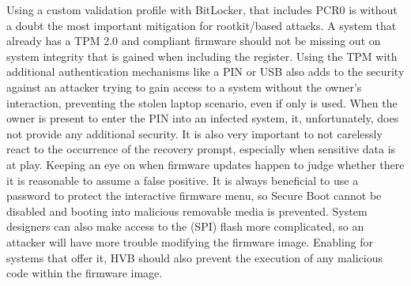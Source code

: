 Using a custom validation profile with BitLocker, that includes \ac{PCR}0 is without a doubt the most important mitigation for rootkit\-/based attacks.
A system that already has a \ac{TPM} 2.0 and compliant firmware should not be missing out on system integrity that is gained when including the register.
Using the \ac{TPM} with additional authentication mechanisms like a \ac{PIN} or \ac{USB} also adds to the security against an attacker trying to gain access to a system without the owner's interaction, preventing the stolen laptop scenario, even if only \hyperref[tab:pcr-usage]{} is used.
When the owner is present to enter the \ac{PIN} into an infected system, it, unfortunately, does not provide any additional security.
It is also very important to not carelessly react to the occurrence of the recovery prompt, especially when sensitive data is at play.
Keeping an eye on when firmware updates happen to judge whether there it is reasonable to assume a false positive.
It is always beneficial to use a password to protect the interactive firmware menu, so Secure Boot cannot be disabled and booting into malicious removable media is prevented.
System designers can also make access to the (\ac{SPI}) flash more complicated, so an attacker will have more trouble modifying the firmware image.
Enabling for systems that offer it, \ac{HVB} should also prevent the execution of any malicious code within the firmware image.